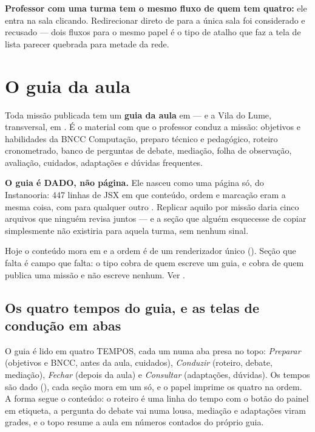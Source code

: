 \begin{regra}
\textbf{Professor com uma turma tem o mesmo fluxo de quem tem quatro:} ele entra
na sala clicando. Redirecionar direto de  para a única sala foi
considerado e recusado --- dois fluxos para o mesmo papel é o tipo de atalho que
faz a tela de lista parecer quebrada para metade da rede.
\end{regra}

\section{O guia da aula}
\label{sec:guia-da-aula}

Toda missão publicada tem um \textbf{guia da aula} em
 --- e a Vila do Lume, transversal, em
. É o material com que o
professor conduz a missão: objetivos e habilidades da BNCC Computação, preparo
técnico e pedagógico, roteiro cronometrado, banco de perguntas de debate,
mediação, folha de observação, avaliação, cuidados, adaptações e dúvidas
frequentes.

\begin{decisao}
\textbf{O guia é DADO, não página.} Ele nasceu como uma página só, do
Instanooria: 447 linhas de JSX em que conteúdo, ordem e marcação eram a mesma
coisa, com  para qualquer outro . Replicar aquilo por
missão daria cinco arquivos que ninguém revisa juntos --- e a seção que alguém
esquecesse de copiar simplesmente não existiria para aquela turma, sem nenhum
sinal.

Hoje o conteúdo mora em  e a ordem
é de um renderizador único (). Seção que falta é
campo que falta: o tipo cobra de quem escreve um guia, e
 cobra de quem publica uma missão e não escreve
nenhum. Ver .
\end{decisao}

\subsection{Os quatro tempos do guia, e as telas de condução em abas}

O guia é lido em quatro TEMPOS, cada um numa aba presa no topo:
\emph{Preparar} (objetivos e BNCC, antes da aula, cuidados), \emph{Conduzir}
(roteiro, debate, mediação), \emph{Fechar} (depois da aula) e \emph{Consultar}
(adaptações, dúvidas). Os tempos são dado (), cada seção
mora em um só, e o papel imprime os quatro na ordem. A forma segue o conteúdo:
o roteiro é uma linha do tempo com o botão do painel em etiqueta, a pergunta do
debate vai numa lousa, mediação e adaptações viram grades, e o topo resume a
aula em números contados do próprio guia.

